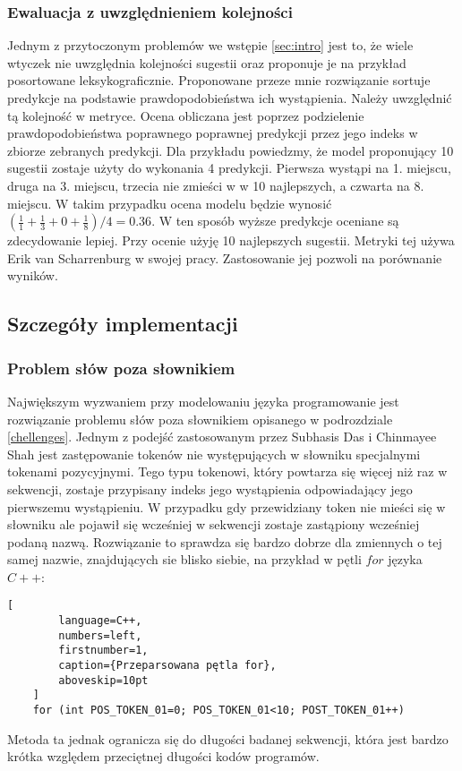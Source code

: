 \subsubsection{Ewaluacja z uwzględnieniem kolejności}
Jednym z przytoczonym problemów we wstępie \ref{sec:intro} jest to, że wiele wtyczek nie uwzględnia kolejności sugestii oraz proponuje je na przykład posortowane leksykograficznie. Proponowane przeze mnie rozwiązanie 
sortuje predykcje na podstawie prawdopodobieństwa ich wystąpienia. Należy uwzględnić tą kolejność w metryce. Ocena obliczana jest poprzez podzielenie prawdopodobieństwa poprawnego poprawnej predykcji przez 
jego indeks w zbiorze zebranych predykcji. Dla przykładu powiedzmy, że model proponujący 10 sugestii zostaje użyty do wykonania 4 predykcji. Pierwsza wystąpi na 1. miejscu, druga na 3. miejscu, trzecia nie zmieści w w 10 najlepszych, 
a czwarta na 8. miejscu. W takim przypadku ocena modelu będzie wynosić \begin{math}(\frac{1}{1}+ \frac{1}{3}+ 0 +\frac{1}{8})/4 = 0.36\end{math}. W ten sposób wyższe predykcje oceniane są zdecydowanie lepiej.
Przy ocenie użyję 10 najlepszych sugestii.  Metryki tej używa Erik van Scharrenburg \cite{erik} w swojej pracy. Zastosowanie jej pozwoli na porównanie wyników. 

\subsection{Szczegóły implementacji}
\subsubsection{Problem słów poza słownikiem}
\label{oov}
Największym wyzwaniem przy modelowaniu języka programowanie jest rozwiązanie problemu słów poza słownikiem opisanego w podrozdziale \ref{chellenges}. 
Jednym z podejść zastosowanym przez Subhasis Das i Chinmayee Shah jest zastępowanie tokenów nie występujących w słowniku 
specjalnymi tokenami pozycyjnymi. Tego typu tokenowi, który powtarza się więcej niż raz w sekwencji, zostaje przypisany indeks jego wystąpienia 
odpowiadający jego pierwszemu wystąpieniu. W przypadku gdy przewidziany token nie mieści się w słowniku ale pojawił się wcześniej w 
sekwencji zostaje zastąpiony wcześniej podaną nazwą. Rozwiązanie to sprawdza się bardzo dobrze dla zmiennych o tej samej nazwie, znajdujących 
sie blisko siebie, na przykład w pętli \begin{math}for\end{math} języka \begin{math}C++\end{math}: 
\begin{addmargin}[10mm]{0mm}
    \begin{lstlisting}[
        language=C++,
        numbers=left,
        firstnumber=1,
        caption={Przeparsowana pętla for},
        aboveskip=10pt
    ]
    for (int POS_TOKEN_01=0; POS_TOKEN_01<10; POST_TOKEN_01++)
    \end{lstlisting}
    \end{addmargin}
Metoda ta jednak ogranicza się do długości badanej sekwencji, która jest bardzo krótka względem przeciętnej długości kodów programów.


